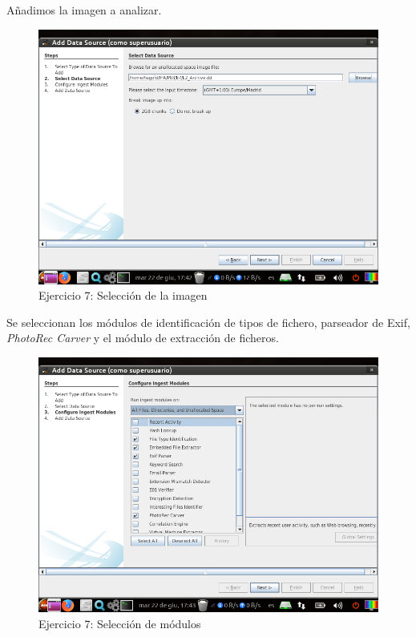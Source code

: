 \documentclass[11pt]{article}
\begin{document}
Añadimos la imagen a analizar.

\begin{figure}[H]
    \caption{Ejercicio 7: Selección de la imagen}
    \centering
    \includegraphics[scale=0.7]{e7-3.png}
\end{figure}

Se seleccionan los módulos de identificación de tipos de fichero, parseador de Exif, \textit{PhotoRec Carver} y el módulo de extracción de ficheros.

\begin{figure}[H]
    \caption{Ejercicio 7: Selección de módulos}
    \centering
    \includegraphics[scale=0.7]{e7-4.png}
\end{figure}
\end{document}
